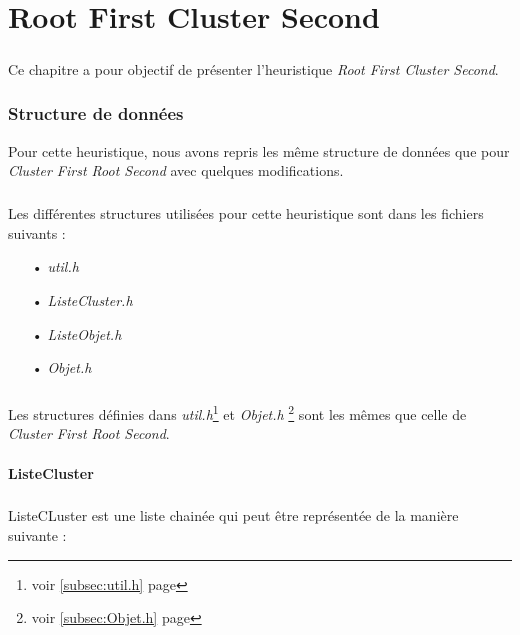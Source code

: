 \documentclass[twoside,UTF8]{EPURapport}
\begin{document}

\chapter{Root First Cluster Second}

\paragraph{}
Ce chapitre a pour objectif de présenter l'heuristique \textit{Root First Cluster Second}.

\subsection{Structure de données}

Pour cette heuristique, nous avons repris les même structure de données que pour \textit{Cluster First Root Second} avec quelques modifications.

\paragraph{}
Les différentes structures utilisées pour cette heuristique sont dans les fichiers suivants :
\begin{itemize}
	\item[•]\textit{util.h}
	\item[•]\textit{ListeCluster.h}
	\item[•]\textit{ListeObjet.h}
	\item[•]\textit{Objet.h}
\end{itemize}

\paragraph{}
Les structures définies dans \textit{util.h}\footnote{voir \ref{subsec:util.h} page \pageref{subsec:util.h}} et \textit{Objet.h} \footnote{voir \ref{subsec:Objet.h} page \pageref{subsec:Objet.h}} sont les mêmes que celle de \textit{Cluster First Root Second}. 

\subsubsection{ListeCluster}

\paragraph{}
ListeCLuster est une liste chainée qui peut être représentée de la manière suivante : 
\end{document}
